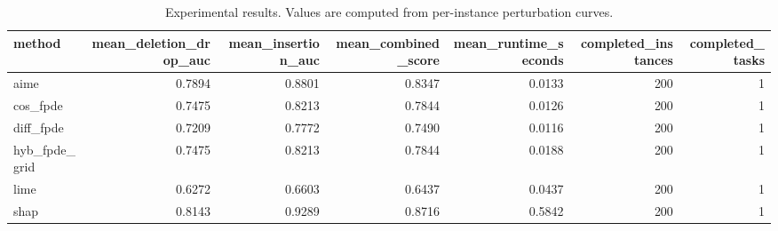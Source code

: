 \begin{table}[t]
\caption{Experimental results. Values are computed from per-instance perturbation curves.}
\label{tab:main_results_computed}
\centering
\begin{tabular}{lrrrrrr}
\toprule
method & mean\_deletion\_drop\_auc & mean\_insertion\_auc & mean\_combined\_score & mean\_runtime\_seconds & completed\_instances & completed\_tasks \\
\midrule
aime & 0.7894 & 0.8801 & 0.8347 & 0.0133 & 200 & 1 \\
cos\_fpde & 0.7475 & 0.8213 & 0.7844 & 0.0126 & 200 & 1 \\
diff\_fpde & 0.7209 & 0.7772 & 0.7490 & 0.0116 & 200 & 1 \\
hyb\_fpde\_grid & 0.7475 & 0.8213 & 0.7844 & 0.0188 & 200 & 1 \\
lime & 0.6272 & 0.6603 & 0.6437 & 0.0437 & 200 & 1 \\
shap & 0.8143 & 0.9289 & 0.8716 & 0.5842 & 200 & 1 \\
\bottomrule
\end{tabular}

\end{table}
